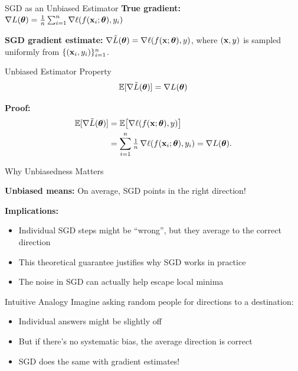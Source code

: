 \documentclass[usenames,dvipsnames]{beamer}
\newcommand{\E}{\mathbb{E}}
\begin{document}
  \begin{frame}{SGD as an Unbiased Estimator}
\textbf{True gradient:}
$\nabla L(\boldsymbol{\theta})=\tfrac{1}{n}\sum_{i=1}^n \nabla \ell(f(\mathbf{x}_i;\boldsymbol{\theta}),y_i)$

\pause
\textbf{SGD gradient estimate:}
$\nabla \tilde{L}(\boldsymbol{\theta})=\nabla \ell(f(\mathbf{x};\boldsymbol{\theta}),y)$,
where $(\mathbf{x},y)$ is sampled uniformly from $\{(\mathbf{x}_i,y_i)\}_{i=1}^n$.

\pause
\begin{theorembox}{Unbiased Estimator Property}
\[
\E[\nabla \tilde{L}(\vtheta)] = \nabla L(\vtheta)
\]
\end{theorembox}

\pause
\textbf{Proof:}
\begin{align*}
\E[\nabla \tilde{L}(\vtheta)]
&=\E\big[\nabla \ell(f(\vx;\vtheta),y)\big]\\
&=\sum_{i=1}^n \tfrac{1}{n}\,\nabla \ell(f(\vx_i;\vtheta),y_i)
= \nabla L(\vtheta).
\end{align*}
  \end{frame}

  \begin{frame}{Why Unbiasedness Matters}
    \begin{keypointsbox}
    \textbf{Unbiased means:} On average, SGD points in the right direction!
    \end{keypointsbox}
    
    \pause
    \textbf{Implications:}
    \begin{itemize}[<+->]
        \item Individual SGD steps might be ``wrong'', but they average to the correct direction
        \item This theoretical guarantee justifies why SGD works in practice
        \item The noise in SGD can actually help escape local minima
    \end{itemize}
    
    \pause
    \begin{examplebox}{Intuitive Analogy}
    Imagine asking random people for directions to a destination:
    \begin{itemize}
        \item Individual answers might be slightly off
        \item But if there's no systematic bias, the average direction is correct
        \item SGD does the same with gradient estimates!
    \end{itemize}
    \end{examplebox}
  \end{frame}
\end{document}
